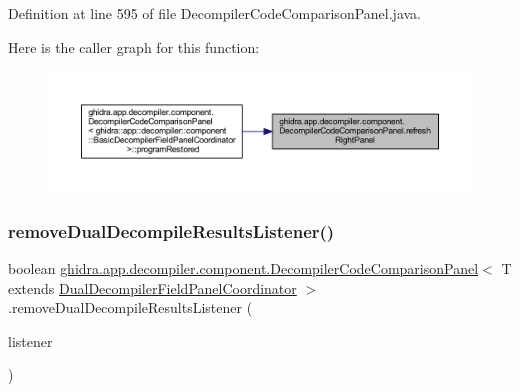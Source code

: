 Definition at line 595 of file Decompiler\+Code\+Comparison\+Panel.\+java.

Here is the caller graph for this function\+:
\nopagebreak
\begin{figure}[H]
\begin{center}
\leavevmode
\includegraphics[width=350pt]{classghidra_1_1app_1_1decompiler_1_1component_1_1_decompiler_code_comparison_panel_a72394cb529eca4eb319b00695288cec9_icgraph}
\end{center}
\end{figure}
\mbox{\label{classghidra_1_1app_1_1decompiler_1_1component_1_1_decompiler_code_comparison_panel_aa6115389c2f73fdf7cb95e3cd877195a}} 
\subsubsection{\texorpdfstring{removeDualDecompileResultsListener()}{removeDualDecompileResultsListener()}}
{\footnotesize\ttfamily boolean \mbox{\hyperlink{classghidra_1_1app_1_1decompiler_1_1component_1_1_decompiler_code_comparison_panel}{ghidra.\+app.\+decompiler.\+component.\+Decompiler\+Code\+Comparison\+Panel}}$<$ T extends \mbox{\hyperlink{classghidra_1_1app_1_1decompiler_1_1component_1_1_dual_decompiler_field_panel_coordinator}{Dual\+Decompiler\+Field\+Panel\+Coordinator}} $>$.remove\+Dual\+Decompile\+Results\+Listener (\begin{DoxyParamCaption}\item[{\mbox{\hyperlink{interfaceghidra_1_1app_1_1decompiler_1_1component_1_1_dual_decompile_results_listener}{Dual\+Decompile\+Results\+Listener}}}]{listener }\end{DoxyParamCaption})\hspace{0.3cm}{\ttfamily [inline]}}


